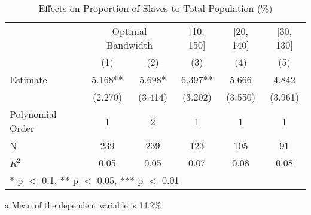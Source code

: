 \begin{table}[!h]

\caption{Effects on Proportion of Slaves to Total Population (\%) \label{tab:rdd_free_slave}}
\centering
\begin{threeparttable}
\begin{tabular}[t]{lccccc}
\toprule
\multicolumn{1}{c}{} & \multicolumn{2}{c}{Optimal Bandwidth} & \multicolumn{1}{c}{[10, 150]} & \multicolumn{1}{c}{[20, 140]} & \multicolumn{1}{c}{[30, 130]} \\
\cmidrule(l{3pt}r{3pt}){2-3} \cmidrule(l{3pt}r{3pt}){4-4} \cmidrule(l{3pt}r{3pt}){5-5} \cmidrule(l{3pt}r{3pt}){6-6}
  & (1) & (2) & (3) & (4) & (5)\\
\midrule
Estimate & \num{5.168}** & \num{5.698}* & \num{6.397}** & \num{5.666} & \num{4.842}\\
 & (\num{2.270}) & (\num{3.414}) & (\num{3.202}) & (\num{3.550}) & (\num{3.961})\\

\midrule
Polynomial Order & 1 & 2 & 1 & 1 & 1\\
N & \num{239} & \num{239} & \num{123} & \num{105} & \num{91}\\
$R^2$ & \num{0.05} & \num{0.05} & \num{0.07} & \num{0.08} & \num{0.08}\\
\bottomrule
\multicolumn{6}{l}{\rule{0pt}{1em}* p $<$ 0.1, ** p $<$ 0.05, *** p $<$ 0.01}\\
\end{tabular}
\begin{tablenotes}
\item[a] Mean of the dependent variable is 14.2\%
\end{tablenotes}
\end{threeparttable}
\end{table}
